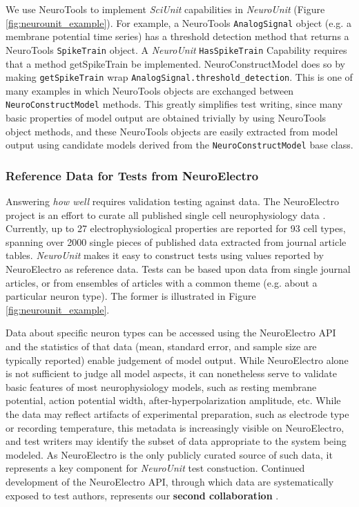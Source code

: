 \documentclass[11pt,letterpaper]{article}
\begin{document}
We use NeuroTools to implement \textit{SciUnit} capabilities in \textit{NeuroUnit} (Figure \ref{fig:neurounit_example}).  For example, a NeuroTools \verb|AnalogSignal| object (e.g. a membrane potential time series) has a threshold detection method that returns a NeuroTools \verb|SpikeTrain| object.  A \textit{NeuroUnit} \verb|HasSpikeTrain| Capability requires that a method getSpikeTrain be implemented.  NeuroConstructModel does so by making \verb|getSpikeTrain| wrap \verb|AnalogSignal.threshold_detection|.  This is one of many examples in which NeuroTools objects are exchanged between \verb|NeuroConstructModel| methods.  This greatly simplifies test writing, since many basic properties of model output are obtained trivially by using NeuroTools object methods, and these NeuroTools objects are easily extracted from model output using candidate models derived from the \verb|NeuroConstructModel| base class.  

\subsubsection{Reference Data for Tests from NeuroElectro}
Answering \textit{how well} requires validation testing against data. The NeuroElectro project \cite{neuroelectro_url} is an effort to curate all published single cell neurophysiology data \cite{tripathy_neuroelectro:_2012}.  Currently, up to 27 electrophysiological properties are reported for 93 cell types, spanning over 2000 single pieces of published data extracted from journal article tables.  \textit{NeuroUnit} makes it easy to construct tests using values reported by NeuroElectro as reference data. Tests can be based upon data from single journal articles, or from ensembles of articles with a common theme (e.g. about a particular neuron type).  The former is illustrated in Figure \ref{fig:neurounit_example}.

Data about specific neuron types can be accessed using the NeuroElectro API and the statistics of that data (mean, standard error, and sample size are typically reported) enable judgement of model output.  While NeuroElectro alone is not sufficient to judge all model aspects, it can nonetheless serve to validate basic features of most neurophysiology models, such as resting membrane potential, action potential width, after-hyperpolarization amplitude, etc.  While the data may reflect artifacts of experimental preparation, such as electrode type or recording temperature, this metadata is increasingly visible on NeuroElectro, and test writers may identify the subset of data appropriate to the system being modeled.  As NeuroElectro is the only publicly curated source of such data, it represents a key component for \textit{NeuroUnit} test constuction.  Continued development of the NeuroElectro API, through which data are systematically exposed to test authors, represents our \textbf{second collaboration} \cite{neuroelectro_dev_url}.  
\end{document}
